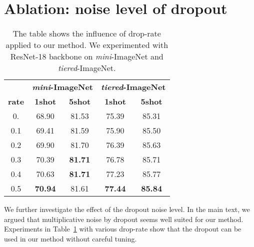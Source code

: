 \documentclass{article}
\begin{document}
\section{Ablation: noise level of dropout}
\begin{table}[h]
	\vspace{-0.15in}
	\caption{The table shows the influence of drop-rate applied to our method. We experimented with ResNet-18 backbone on \textit{mini}-ImageNet and \textit{tiered}-ImageNet.}
	\label{table:noise}
	\begin{small}
		\begin{center}
			\begin{tabular}{ccccc}
				\hline
				\textbf{} & \multicolumn{2}{c}{\textbf{\textit{mini}-ImageNet}} & \multicolumn{2}{c}{\textbf{\textit{tiered}-ImageNet}} \\
				\textbf{rate} & \textbf{1shot} & \textbf{5shot} & \textbf{1shot} & \textbf{5shot} \\ \hline
				0. & 68.90 & 81.53 & 75.39 & 85.31 \\
				0.1 & 69.41 & 81.59 & 75.90 & 85.50 \\
				0.2 & 69.90 & 81.70 & 76.39 & 85.63 \\
				0.3 & 70.39 & \textbf{81.71} & 76.78 & 85.71 \\
				0.4 & 70.63 & \textbf{81.71} & 77.23 & 85.77 \\
				\rowcolor[HTML]{EFEFEF} 0.5 & \textbf{70.94} & 81.61 & \textbf{77.44} & \textbf{85.84} \\ \hline
			\end{tabular}
		\end{center}
	\end{small}
\end{table}
We further investigate the effect of the dropout noise level.
In the main text, we argued that multiplicative noise by dropout seems well suited for our method. Experiments in Table~\ref{table:noise} with various drop-rate show that the dropout can be used in our method without careful tuning.
\end{document}
